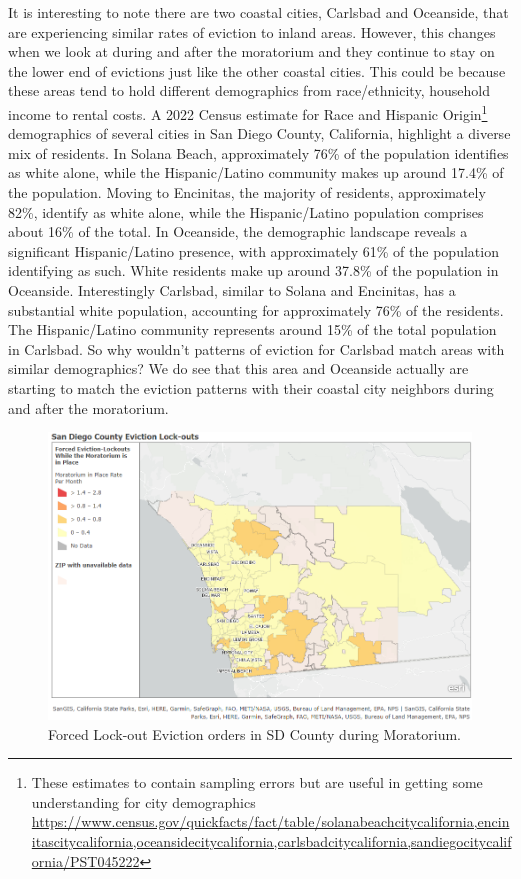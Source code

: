 \documentclass[man, 12pt, donotrepeattitle, floatsintext]{apa7} %
\begin{document}
It is interesting to note there are two coastal cities, Carlsbad and Oceanside, that are experiencing similar rates of eviction to inland areas. However, this changes when we look at during and after the moratorium and they continue to stay on the lower end of evictions just like the other coastal cities. This could be because these areas tend to hold different demographics from race/ethnicity, household income to rental costs. A 2022 Census estimate for Race and Hispanic Origin\footnote{These estimates to contain sampling errors but are useful in getting some understanding for city demographics \url{https://www.census.gov/quickfacts/fact/table/solanabeachcitycalifornia,encinitascitycalifornia,oceansidecitycalifornia,carlsbadcitycalifornia,sandiegocitycalifornia/PST045222}} demographics of several cities in San Diego County, California, highlight a diverse mix of residents. In Solana Beach, approximately 76\% of the population identifies as white alone, while the Hispanic/Latino community makes up around 17.4\% of the population. Moving to Encinitas, the majority of residents, approximately 82\%, identify as white alone, while the Hispanic/Latino population comprises about 16\% of the total. In Oceanside, the demographic landscape reveals a significant Hispanic/Latino presence, with approximately 61\% of the population identifying as such. White residents make up around 37.8\% of the population in Oceanside. Interestingly Carlsbad, similar to Solana and Encinitas, has a substantial white population, accounting for approximately 76\% of the residents. The Hispanic/Latino community represents around 15\% of the total population in Carlsbad. So why wouldn’t patterns of eviction for Carlsbad match areas with similar demographics? We do see that this area and Oceanside actually are starting to match the eviction patterns with their coastal city neighbors during and after the moratorium. 


\begin{figure}[H]
  \includegraphics[width=\linewidth]{figures/gis_during_figure2.png}
  \caption{Forced Lock-out Eviction orders in SD County during Moratorium.}
  \label{fig:ForcedEvcitions_DURING_Fig2}
\end{figure}
\end{document}
